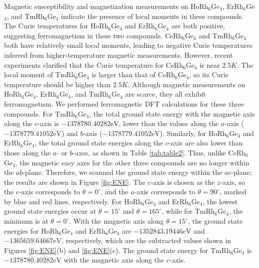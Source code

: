 \documentclass[preprint,12pt]{elsarticle}
\begin{document}
Magnetic susceptibility and magnetization measurements  \cite{Vosswinkel2013_Zfauac639-2623} on HoRh$_6$Ge$_4$, ErRh$_6$Ge$_4$, and TmRh$_6$Ge$_4$ indicate the presence of local moments in these compounds. The Curie temperatures for HoRh$_6$Ge$_4$ and ErRh$_6$Ge$_4$ are both positive, suggesting ferromagnetism in these two compounds. CeRh$_6$Ge$_4$ and TmRh$_6$Ge$_4$ both have relatively small local moments, leading to negative Curie temperatures inferred from higher-temperature magnetic measurements. However, recent experiments clarified that the Curie temperature for CeRh$_6$Ge$_4$ is near $2.5 K$. The local moment of TmRh$_6$Ge$_4$ is larger than that of CeRh$_6$Ge$_4$, so its Curie temperature should be higher than $2.5 K$. Although magnetic measurements on HoRh$_6$Ge$_4$, ErRh$_6$Ge$_4$, and TmRh$_6$Ge$_4$ are scarce, they all exhibit ferromagnetism. We performed ferromagnetic DFT calculations for these three compounds. For TmRh$_6$Ge$_4$, the total ground state energy with the magnetic axis along the c-axis is $-1378780.40282 \mathrm{eV}$, lower than the values along the $a$-axis ($-1378779.41052 \mathrm{eV}$) and $b$-axis ($-1378779.41052 \mathrm{eV}$). Similarly, for HoRh$_6$Ge$_4$ and ErRh$_6$Ge$_4$, the total ground state energies along the $c$-axis are also lower than those along the $a$- or $b$-axes, as shown in Table \ref{tab:table2}. Thus, unlike CeRh$_6$Ge$_4$, the magnetic easy axes for the other three compounds are no longer within the $ab$-plane. Therefore, we scanned the ground state energy within the $ac$-plane; the results are shown in Figure \ref{fig:ENE}. The $c$-axis is chosen as the $z$-axis, so the $c$-axis corresponds to $\theta=0^{\circ}$, and the $a$-axis corresponds to $\theta=90^{\circ}$, marked by blue and red lines, respectively. For HoRh$_6$Ge$_4$ and ErRh$_6$Ge$_4$, the lowest ground state energies occur at $\theta=15^{\circ}$ and $\theta=165^{\circ}$, while for TmRh$_6$Ge$_4$, the minimum is at $\theta=0^{\circ}$. With the magnetic axis along $θ=15^{\circ}$, the ground state energies for HoRh$_6$Ge$_4$ and ErRh$_6$Ge$_4$ are $-1352843.19446 \mathrm{eV}$ and $-1365659.64667 \mathrm{eV}$, respectively, which are the subtracted values shown in Figures \ref{fig:ENE}(b) and \ref{fig:ENE}(c). The ground state energy for TmRh$_6$Ge$_4$ is $-1378780.40282 \mathrm{eV}$ with the magnetic axis along the $c$-axis.
\end{document}
